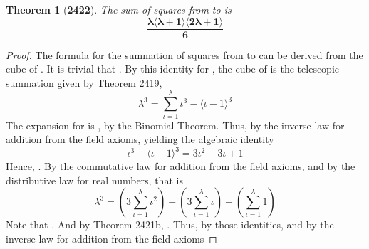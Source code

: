 \documentclass[preview]{standalone}
\newtheorem*{theorem*}{Theorem}
\begin{document}
\begin{theorem*}[\textbf{2422}]
    The sum of squares from  to \bm{$\lambda$} is 
    \begin{equation*}
        \bm{
            \frac{ 
                \lambda 
                \langle \lambda + 1 \rangle 
                \langle 2 \lambda + 1 \rangle 
            }
            {6}
        }
    \end{equation*}
\end{theorem*}

\begin{proof}
    The formula for the summation of squares 
    from  to \bm{$\lambda$} 
    can be derived from the cube of \bm{$\lambda$}.
    It is trivial that 
    . 
    By this identity for \bm{$\lambda$},
    the cube of \bm{$\lambda$} is the telescopic summation given by Theorem 2419, 
    \begin{equation*}
        \lambda ^3 
            = 
        \sum_{\iota=1}^\lambda \iota ^3 - \big \langle \iota - 1 \big \rangle ^3    
    \end{equation*}
    The expansion for 
    is 
    , 
    by the Binomial Theorem. 
    Thus, 
    by the inverse law for addition from the field axioms,
    yielding the algebraic identity
    \begin{equation*}
        \iota ^3 - \big \langle \iota - 1 \big \rangle ^3 
            = 
        3 \iota ^2 - 3 \iota + 1
    \end{equation*}
    Hence, 
    .
    By the commutative law for addition from the field axioms, 
    and by the distributive law for real numbers,
    that is
    \begin{equation*}
        \lambda ^3 
            = 
        \left( 3 \sum_{\iota=1}^\lambda \iota ^2 \right) 
            - 
        \left( 3 \sum_{\iota=1}^\lambda \iota \right) 
            + 
        \left( \sum_{\iota=1}^\lambda 1 \right)
    \end{equation*}
    Note that . 
    And by Theorem 2421b, 
    . 
    Thus, 
    by those identities, 
    and by the inverse law for addition from the field axioms

\end{proof}
\end{document}
